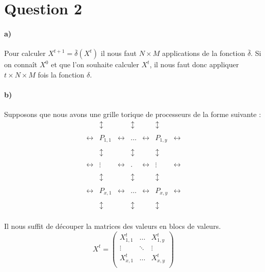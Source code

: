 \documentclass[a4paper]{article}
\begin{document}
  \section*{Question 2}
  
  \paragraph{a)} Pour calculer $X^{t+1} = \bar\delta(X^t)$ il nous faut $N \times M$ applications de la fonction $\bar\delta$. Si on connaît $X^0$ et que l'on souhaite calculer $X^t$, il nous faut donc appliquer $t \times N \times M$ fois la fonction $\delta$.
  
  \paragraph{b)} Supposons que nous avons une grille torique de processeurs de la forme suivante :
  \[\begin{array}{ccccccc}
   & \updownarrow  & & \updownarrow & & \updownarrow \\\\
  \leftrightarrow & \boxed{P_{1, 1}} & \leftrightarrow & \dots & \leftrightarrow & \boxed{P_{1, y}} & \leftrightarrow \\\\
  & \updownarrow  & & \updownarrow & & \updownarrow \\\\
  \leftrightarrow & \vdots & \leftrightarrow & . & \leftrightarrow & \vdots & \leftrightarrow \\\\
  & \updownarrow  & & \updownarrow & & \updownarrow \\\\
  \leftrightarrow & \boxed{P_{x, 1}} & \leftrightarrow & \dots & \leftrightarrow & \boxed{P_{x, y}} & \leftrightarrow \\\\
  & \updownarrow  & & \updownarrow & & \updownarrow \\
  \end{array}\]
  
  Il nous suffit de découper la matrices des valeurs en blocs de valeurs.
  \[X^t = \left(\begin{array}{c|c|c}
  X^t_{1, 1} & \dots & X^t_{1, y}\\
  \hline
  \vdots & \ddots & \vdots\\
  \hline
  X^t_{x, 1} & \dots & X^t_{x, y}\\
  \end{array}\right)\] 
  
\end{document}
